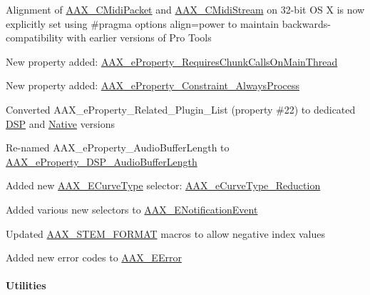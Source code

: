 \begin{DoxyItemize}
\item Alignment of \hyperlink{a00024}{A\+A\+X\+\_\+\+C\+Midi\+Packet} and \hyperlink{a00025}{A\+A\+X\+\_\+\+C\+Midi\+Stream} on 32-\/bit O\+S X is now explicitly set using {\ttfamily \#pragma options align=power} to maintain backwards-\/compatibility with earlier versions of Pro Tools 
\item New property added\+: \hyperlink{a00283_a6571f4e41a5dd06e4067249228e2249ea01bd38243e95666d55b80e79bc13c5cb}{A\+A\+X\+\_\+e\+Property\+\_\+\+Requires\+Chunk\+Calls\+On\+Main\+Thread}  
\item New property added\+: \hyperlink{a00283_a6571f4e41a5dd06e4067249228e2249ea510e79713c2f14ebb0a50ed2ab0ff679}{A\+A\+X\+\_\+e\+Property\+\_\+\+Constraint\+\_\+\+Always\+Process}  
\item Converted {\ttfamily A\+A\+X\+\_\+e\+Property\+\_\+\+Related\+\_\+\+Plugin\+\_\+\+List} (property \#22) to dedicated \hyperlink{a00283_a6571f4e41a5dd06e4067249228e2249ea9dc35184d705e963f14f85df4d71193d}{D\+S\+P} and \hyperlink{a00283_a6571f4e41a5dd06e4067249228e2249eae47f50370ae2f6bf29b8cacc6a41d924}{Native} versions 
\item Re-\/named A\+A\+X\+\_\+e\+Property\+\_\+\+Audio\+Buffer\+Length to \hyperlink{a00283_a6571f4e41a5dd06e4067249228e2249ea09fbd1cbcae0e86ad81005258dc1b67e}{A\+A\+X\+\_\+e\+Property\+\_\+\+D\+S\+P\+\_\+\+Audio\+Buffer\+Length} 
\item Added new \hyperlink{a00342_ga59c73d8f51c5c55d54a728eff39da884}{A\+A\+X\+\_\+\+E\+Curve\+Type} selector\+: \hyperlink{a00342_gga59c73d8f51c5c55d54a728eff39da884a011b1b00d6189a8903735dcae2f8bc93}{A\+A\+X\+\_\+e\+Curve\+Type\+\_\+\+Reduction}  
\item Added various new selectors to \hyperlink{a00206_afab5ea2cfd731fc8f163b6caa685406e}{A\+A\+X\+\_\+\+E\+Notification\+Event}  
\item Updated \hyperlink{a00206_a49ce720dc4840f983ca0f3d4d1fd2e9a}{A\+A\+X\+\_\+\+S\+T\+E\+M\+\_\+\+F\+O\+R\+M\+A\+T} macros to allow negative index values  
\item Added new error codes to \hyperlink{a00207_a5f8c7439f3a706c4f8315a9609811937}{A\+A\+X\+\_\+\+E\+Error} 
\end{DoxyItemize}\hypertarget{a00375_aax_sdk_2p1p0_Utilities}{}\paragraph{Utilities}\label{a00375_aax_sdk_2p1p0_Utilities}

